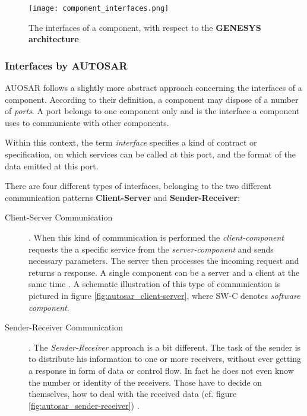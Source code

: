 \begin{figure}[ht]
\centering
\texttt{[image: component\_interfaces.png]}
\caption{The interfaces of a component, with respect to the \textbf{GENESYS architecture} \cite[p.40]{genesys}}
\label{fig:component_interfaces}
\end{figure}


\subsubsection{Interfaces by AUTOSAR}

AUOSAR follows a slightly more abstract approach concerning the interfaces of a component. According to their definition, a component may dispose of a number of \emph{ports}. A port belongs to one component only and is the interface a component uses to communicate with other components.

Within this context, the term \emph{interface} specifies a kind of contract or specification, on which services can be called at this port, and the format of the data emitted at this port.

There are four different types of interfaces, belonging to the two different communication patterns \textbf{Client-Server} and \textbf{Sender-Receiver}: \cite{autosar_intro}

\begin{description}
\item [Client-Server Communication].
When this kind of communication is performed the \emph{client-component} requests the a specific service from the \emph{server-component} and sends necessary parameters. The server then processes the incoming request and returns a response. A single component can be a server and a client at the same time \cite{autosar_intro}. A schematic illustration of this type of communication is pictured in figure \ref{fig:autosar_client-server}, where SW-C denotes \emph{software component}.

\item [Sender-Receiver Communication].
The \emph{Sender-Receiver} approach is a bit different. The task of the sender is to distribute his information to one or more receivers, without ever getting a response in form of data or control flow. In fact he does not even know the number or identity of the receivers. Those have to decide on themselves, how to deal with the received data (cf. figure \ref{fig:autosar_sender-receiver}) \cite{autosar_intro}.
\end{description}

